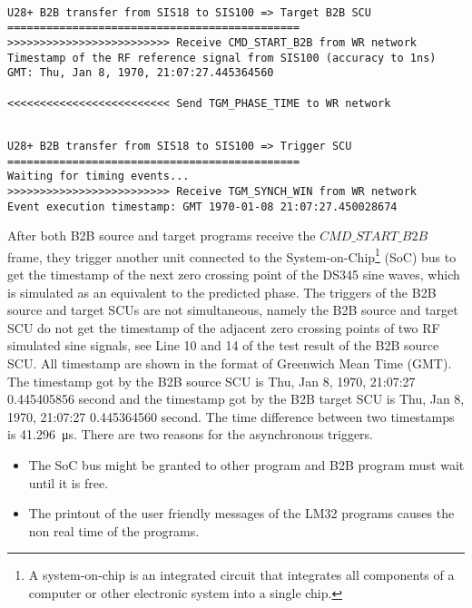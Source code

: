 \begin{lstlisting}[language={[ANSI]C}, keywordstyle=\color{blue!70}, commentstyle=\color{red!50!green!50!blue!50}, frame=shadowbox, rulesepcolor=\color{red!20!green!20!blue!20}]

U28+ B2B transfer from SIS18 to SIS100 => Target B2B SCU
=============================================
>>>>>>>>>>>>>>>>>>>>>>>>> Receive CMD_START_B2B from WR network
Timestamp of the RF reference signal from SIS100 (accuracy to 1ns)
GMT: Thu, Jan 8, 1970, 21:07:27.445364560

<<<<<<<<<<<<<<<<<<<<<<<<< Send TGM_PHASE_TIME to WR network
\end{lstlisting}

\begin{lstlisting}[language={[ANSI]C}, keywordstyle=\color{blue!70}, commentstyle=\color{red!50!green!50!blue!50}, frame=shadowbox, rulesepcolor=\color{red!20!green!20!blue!20}]

U28+ B2B transfer from SIS18 to SIS100 => Trigger SCU
=============================================
Waiting for timing events...
>>>>>>>>>>>>>>>>>>>>>>>>> Receive TGM_SYNCH_WIN from WR network
Event execution timestamp: GMT 1970-01-08 21:07:27.450028674
\end{lstlisting}

After both B2B source and target programs receive the $CMD\_START\_B2B$ frame, they trigger another unit connected to the System-on-Chip\footnote{A system-on-chip is an integrated circuit that integrates all components of a computer or other electronic system into a single chip.}  (SoC) bus to get the timestamp of the next zero crossing point of the DS345 sine waves, which is simulated as an equivalent to the predicted phase. The triggers of the B2B source and target SCUs are not simultaneous, namely the B2B source and target SCU do not get the timestamp of the adjacent zero crossing points of two RF simulated sine signals, see Line 10 and 14 of the test result of the B2B source SCU. All timestamp are shown in the format of Greenwich Mean Time (GMT). The timestamp got by the B2B source SCU is Thu, Jan 8, 1970, 21:07:27 0.445405856 second and the timestamp got by the B2B target SCU is Thu, Jan 8, 1970, 21:07:27 0.445364560 second. The time difference between two timestamps is \SI{41.296}{\us}. There are two reasons for the asynchronous triggers.

\begin{itemize}
	\item
The SoC bus might be granted to other program and B2B program must wait until it is free.
	\item
The printout of the user friendly messages of the LM32 programs causes the non real time of the programs.
\end{itemize}

